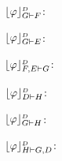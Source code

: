 \begin{example}
\begin{multicols}{3}{
$\projectionDefinitional{\varphi}{G \seq F}$:
\begin{scriptsize}
\begin{prooftree}
 
 
 
\end{prooftree}
\end{scriptsize}

$\projectionDefinitional{\varphi}{G \seq E}$:
\begin{scriptsize}
\begin{prooftree}
 
 
 
\end{prooftree}
\end{scriptsize}

$\projectionDefinitional{\varphi}{F, E \seq G}$:
\begin{scriptsize}
\begin{prooftree}
		 
	 
\end{prooftree}
\end{scriptsize}
}
\end{multicols}


\begin{multicols}{3}{
$\projectionDefinitional{\varphi}{D \seq H}$:
\begin{scriptsize}
\begin{prooftree}
 
 
 
\end{prooftree}
\end{scriptsize}

$\projectionDefinitional{\varphi}{G \seq H}$:
\begin{scriptsize}
\begin{prooftree}
 
 
 
\end{prooftree}
\end{scriptsize}

$\projectionDefinitional{\varphi}{H \seq G, D}$:
\begin{scriptsize}
\begin{prooftree}
		 
	 
\end{prooftree}
\end{scriptsize}
}
\end{multicols}
\end{example}


